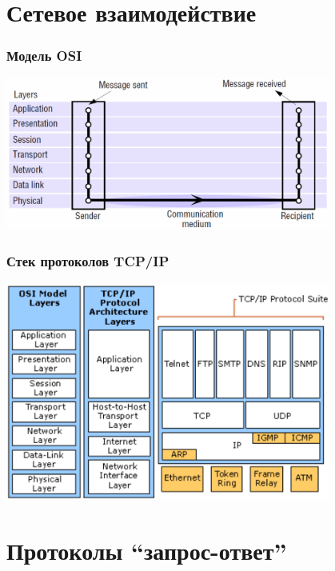 \documentclass[xetex,mathserif,serif]{beamer}
\begin{document}
    \section{Сетевое взаимодействие}

    \begin{frame}
        \frametitle{Модель OSI}
        \begin{center}
            \includegraphics[width=0.8\textwidth]{osiStack.png}
        \end{center}
    \end{frame}

    \begin{frame}
        \frametitle{Стек протоколов TCP/IP}
        \begin{center}
            \includegraphics[width=0.8\textwidth]{tcpIpStack.png}
        \end{center}
    \end{frame}

    \section{Протоколы ``запрос-ответ''}
\end{document}
